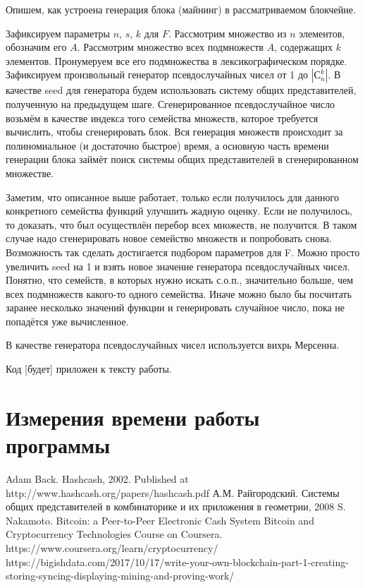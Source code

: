 \documentclass{article}
\begin{document}
    Опишем, как устроена генерация блока (майнинг) в рассматриваемом блокчейне. 

    Зафиксируем параметры $n$, $s$, $k$ для $F$. Рассмотрим множество из $n$ элементов, обозначим его $A$. Рассмотрим множество всех подмножеств $A$, содержащих $k$ элементов. Пронумеруем все его подмножества в лексикографическом порядке. Зафиксируем произвольный генератор псевдослучайных чисел от 1 до $|С_n^k|$. В качестве seed для генератора будем использовать систему общих представителей, полученную на предыдущем шаге. Сгенерированное псевдослучайное число возьмём в качестве индекса того семейства множеств, которое требуется вычислить, чтобы сгенерировать блок. Вся генерация множеств происходит за полиномиальное (и достаточно быстрое) время, а основную часть времени генерации блока займёт поиск системы общих представителей в сгенерированном множестве.

    Заметим, что описанное выше работает, только если получилось для данного конкретного семейства функций улучшить жадную оценку. Если не получилось, то доказать, что был осуществлён перебор всех множеств, не получится. В таком случае надо сгенерировать новое семейство множеств и попробовать снова. Возможность так сделать достигается подбором параметров для F. Можно просто увеличить seed на 1 и взять новое значение генератора псевдослучайных чисел. Понятно, что семейств, в которых нужно искать с.о.п., значительно больше, чем всех подмножеств какого-то одного семейства. Иначе можно было бы посчитать заранее несколько значений функции и генерировать случайное число, пока не попадётся уже вычисленное.

    В качестве генератора псевдослучайных чисел используется вихрь Мерсенна. 

    Код [будет] приложен к тексту работы.

\section{Измерения времени работы программы}
    

\begin{thebibliography}{5}
     Adam Back. Hashcash, 2002. Published at http://www.hashcash.org/papers/hashcash.pdf
     А.М. Райгородский. Системы общих представителей в комбинаторике и их приложения в геометрии, 2008
     S. Nakamoto. Bitcoin: a Peer-to-Peer Electronic Cash System
     Bitcoin and Cryptocurrency Technologies Course on Coursera. https://www.coursera.org/learn/cryptocurrency/
     https://bigishdata.com/2017/10/17/write-your-own-blockchain-part-1-creating-storing-syncing-displaying-mining-and-proving-work/

\end{thebibliography}
\end{document}
